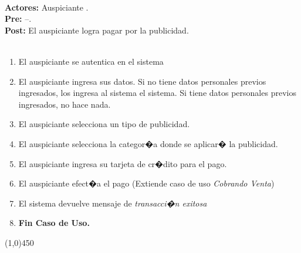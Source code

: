 \documentclass[11pt, a4paper, spanish]{article}
\begin{document}
{ \\ \textbf{Actores:} Auspiciante . \\ \textbf{Pre:} --. \\ \textbf{Post:} El auspiciante logra pagar por la publicidad.\\  \\  \begin{enumerate} \item El auspiciante se autentica en el sistema \item El auspiciante ingresa sus datos. Si no tiene datos personales previos ingresados, los ingresa al sistema el sistema. Si tiene datos personales previos ingresados, no hace nada. \item El auspiciante selecciona un tipo de publicidad. \item El auspiciante selecciona la categor�a donde se aplicar� la publicidad. \item El auspiciante ingresa su tarjeta de cr�dito para el pago. \item El auspiciante efect�a el pago (Extiende caso de uso \emph{Cobrando Venta}) \item El sistema devuelve mensaje de \emph{transacci�n exitosa} \item \textbf{Fin Caso de Uso.} \end{enumerate} \begin{center} \line(1,0){450} \end{center}

}
\end{document}

